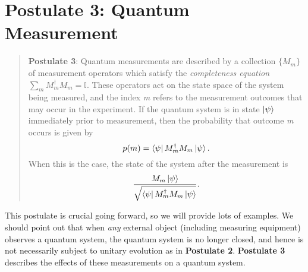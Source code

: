 \section{Postulate 3: Quantum Measurement} \label{section: postulate 3}



\begin{quote}
    \textbf{Postulate 3}: Quantum measurements are described by a collection $\{M_m\}$ of measurement operators which satisfy the {\emph{completeness equation}} $\sum\limits_m M_m^\dagger M_m =\mathbb{I}$. These operators act on the state space of the system being measured, and the index {\emph{m}} refers to the measurement outcomes that may occur in the experiment. If the quantum system is in state $\ket{\psi}$ immediately prior to measurement, then the probability that outcome {\emph{m}} occurs is given by 
    \begin{equation} \label{eqn: general measurement probability}
        p(m)=\bra{\psi}M_m^\dagger M_m \ket{\psi}.
    \end{equation} 
   When this is the case, the state of the system after the measurement is
    \begin{equation} \label{eqn: general measurement post state}
        \frac{M_m \ket{\psi}}{\sqrt{\bra{\psi}M_m^\dagger M_m \ket{\psi}}}.
    \end{equation}

\end{quote}




This postulate is crucial going forward, so we will provide lots of examples.  We should point out that when {\emph{any}} external object (including measuring equipment) observes a quantum system, the quantum system is no longer closed, and hence is not necessarily subject to unitary evolution as in {\bf{Postulate 2}}. {\bf{Postulate 3}} describes the effects of these measurements on a quantum system. 

